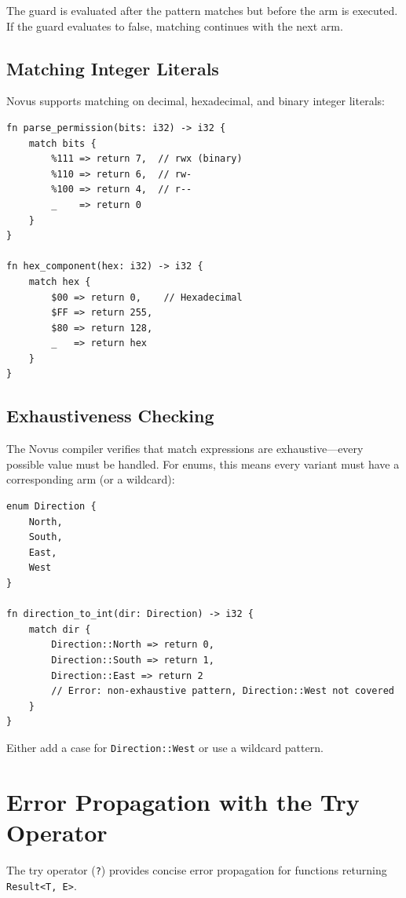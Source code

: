 The guard is evaluated after the pattern matches but before the arm is executed. If the guard evaluates to false, matching continues with the next arm.

\subsection{Matching Integer Literals}
\label{subsec:match-integers}

Novus supports matching on decimal, hexadecimal, and binary integer literals:

\begin{lstlisting}
fn parse_permission(bits: i32) -> i32 {
    match bits {
        %111 => return 7,  // rwx (binary)
        %110 => return 6,  // rw-
        %100 => return 4,  // r--
        _    => return 0
    }
}

fn hex_component(hex: i32) -> i32 {
    match hex {
        $00 => return 0,    // Hexadecimal
        $FF => return 255,
        $80 => return 128,
        _   => return hex
    }
}
\end{lstlisting}

\subsection{Exhaustiveness Checking}
\label{subsec:match-exhaustiveness}

The Novus compiler verifies that match expressions are exhaustive---every possible value must be handled. For enums, this means every variant must have a corresponding arm (or a wildcard):

\begin{lstlisting}
enum Direction {
    North,
    South,
    East,
    West
}

fn direction_to_int(dir: Direction) -> i32 {
    match dir {
        Direction::North => return 0,
        Direction::South => return 1,
        Direction::East => return 2
        // Error: non-exhaustive pattern, Direction::West not covered
    }
}
\end{lstlisting}

Either add a case for \texttt{Direction::West} or use a wildcard pattern.

\section{Error Propagation with the Try Operator}
\label{sec:try-operator}

The try operator (\texttt{?}) provides concise error propagation for functions returning \texttt{Result<T, E>}.

